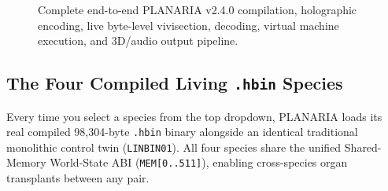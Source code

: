 \documentclass[10pt,letterpaper]{article}
\begin{document}
\begin{figure}[ht]
\caption[End-to-End PLANARIA v2.4.0 Compilation, Vivisection, Decoding \& Execution Pipeline]{Complete end-to-end PLANARIA v2.4.0 compilation, holographic encoding, live byte-level vivisection, decoding, virtual machine execution, and 3D/audio output pipeline.}
\label{fig:arch-pipeline}
\end{figure}

\subsection{The Four Compiled Living \texttt{.hbin} Species}
\label{sec:species}

Every time you select a species from the top dropdown, PLANARIA loads its real compiled 98,304-byte \texttt{.hbin} binary alongside an identical traditional monolithic control twin (\texttt{LINBIN01}). All four species share the unified Shared-Memory World-State ABI (\texttt{MEM[0..511]}), enabling cross-species organ transplants between any pair.
\end{document}
